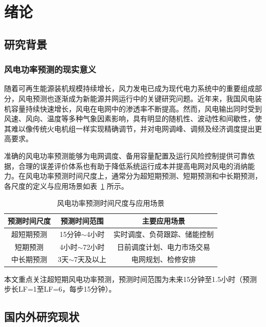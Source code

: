 \section{绪论}

\subsection{研究背景}

\subsubsection{风电功率预测的现实意义}
随着可再生能源装机规模持续增长，风力发电已成为现代电力系统中的重要组成部分，风电预测也逐渐成为新能源并网运行中的关键研究问题\cite{liu_comprehensive_2025,__2019}。近年来，我国风电装机容量持续快速增长，风电在电网中的渗透率不断提高。然而，风电输出同时受到风速、风向、温度等多种气象因素影响，具有明显的随机性、波动性和间歇性，使其难以像传统火电机组一样实现精确调节，并对电网调峰、调频及经济调度提出更高要求\cite{yang_survey_2024,__2017-1}。

准确的风电功率预测能够为电网调度、备用容量配置及运行风险控制提供可靠依据，合理的误差评价体系也有助于降低系统运行成本并提高电网对风电的消纳能力\cite{__2021,__2011}。在风电功率预测时间尺度上，通常分为超短期预测、短期预测和中长期预测，各尺度的定义与应用场景如表~\ref{tab:wind_power_prediction_time_scale} 所示。

\begin{table}[h]
\centering
\caption{风电功率预测时间尺度与应用场景}
\label{tab:wind_power_prediction_time_scale}
\begin{tabular}{ccc}
\toprule
预测时间尺度 & 预测时间范围 & 主要应用场景 \\
\midrule
超短期预测 & 15分钟$\sim$4小时 & 实时调度、负荷跟踪、储能控制 \\
短期预测 & 4小时$\sim$72小时 & 日前调度计划、电力市场交易 \\
中长期预测 & 3天$\sim$7天及以上 & 电网规划、检修安排 \\
\bottomrule
\end{tabular}
\end{table}

本文重点关注超短期风电功率预测，预测时间范围为未来15分钟至1.5小时（预测步长LF=1至LF=6，每步15分钟）。



\subsection{国内外研究现状}
